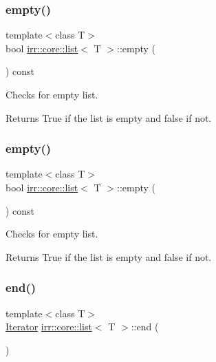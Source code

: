 \subsubsection{\texorpdfstring{empty()}{empty()}\hspace{0.1cm}{\footnotesize\ttfamily [1/2]}}
{\footnotesize\ttfamily template$<$class T$>$ \\
bool \hyperlink{classirr_1_1core_1_1list}{irr\+::core\+::list}$<$ T $>$\+::empty (\begin{DoxyParamCaption}{ }\end{DoxyParamCaption}) const\hspace{0.3cm}{\ttfamily [inline]}}



Checks for empty list. 

\begin{DoxyReturn}{Returns}
True if the list is empty and false if not. 
\end{DoxyReturn}
\mbox{\label{classirr_1_1core_1_1list_aa0958447b2269fff0d650cb464ba84bd}} 
\subsubsection{\texorpdfstring{empty()}{empty()}\hspace{0.1cm}{\footnotesize\ttfamily [2/2]}}
{\footnotesize\ttfamily template$<$class T$>$ \\
bool \hyperlink{classirr_1_1core_1_1list}{irr\+::core\+::list}$<$ T $>$\+::empty (\begin{DoxyParamCaption}{ }\end{DoxyParamCaption}) const\hspace{0.3cm}{\ttfamily [inline]}}



Checks for empty list. 

\begin{DoxyReturn}{Returns}
True if the list is empty and false if not. 
\end{DoxyReturn}
\mbox{\label{classirr_1_1core_1_1list_aa80509dac5224fa57cc548e39480a115}} 
\subsubsection{\texorpdfstring{end()}{end()}\hspace{0.1cm}{\footnotesize\ttfamily [1/4]}}
{\footnotesize\ttfamily template$<$class T$>$ \\
\hyperlink{classirr_1_1core_1_1list_1_1Iterator}{Iterator} \hyperlink{classirr_1_1core_1_1list}{irr\+::core\+::list}$<$ T $>$\+::end (\begin{DoxyParamCaption}{ }\end{DoxyParamCaption})\hspace{0.3cm}{\ttfamily [inline]}}



